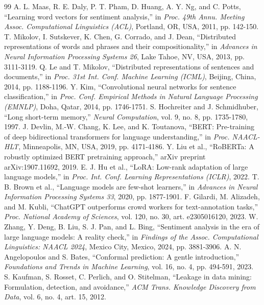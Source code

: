 \begin{thebibliography}{99}
 A. L. Maas, R. E. Daly, P. T. Pham, D. Huang, A. Y. Ng, and C. Potts, ``Learning word vectors for sentiment analysis,'' in \emph{Proc. 49th Annu. Meeting Assoc. Computational Linguistics (ACL)}, Portland, OR, USA, 2011, pp. 142-150.
 T. Mikolov, I. Sutskever, K. Chen, G. Corrado, and J. Dean, ``Distributed representations of words and phrases and their compositionality,'' in \emph{Advances in Neural Information Processing Systems 26}, Lake Tahoe, NV, USA, 2013, pp. 3111-3119.
 Q. Le and T. Mikolov, ``Distributed representations of sentences and documents,'' in \emph{Proc. 31st Int. Conf. Machine Learning (ICML)}, Beijing, China, 2014, pp. 1188-1196.
 Y. Kim, ``Convolutional neural networks for sentence classification,'' in \emph{Proc. Conf. Empirical Methods in Natural Language Processing (EMNLP)}, Doha, Qatar, 2014, pp. 1746-1751.
 S. Hochreiter and J. Schmidhuber, ``Long short-term memory,'' \emph{Neural Computation}, vol. 9, no. 8, pp. 1735-1780, 1997.
 J. Devlin, M.-W. Chang, K. Lee, and K. Toutanova, ``BERT: Pre-training of deep bidirectional transformers for language understanding,'' in \emph{Proc. NAACL-HLT}, Minneapolis, MN, USA, 2019, pp. 4171-4186.
 Y. Liu et al., ``RoBERTa: A robustly optimized BERT pretraining approach,'' arXiv preprint arXiv:1907.11692, 2019.
 E. J. Hu et al., ``LoRA: Low-rank adaptation of large language models,'' in \emph{Proc. Int. Conf. Learning Representations (ICLR)}, 2022.
 T. B. Brown et al., ``Language models are few-shot learners,'' in \emph{Advances in Neural Information Processing Systems 33}, 2020, pp. 1877-1901.
 F. Gilardi, M. Alizadeh, and M. Kubli, ``ChatGPT outperforms crowd workers for text-annotation tasks,'' \emph{Proc. National Academy of Sciences}, vol. 120, no. 30, art. e2305016120, 2023.
 W. Zhang, Y. Deng, B. Liu, S. J. Pan, and L. Bing, ``Sentiment analysis in the era of large language models: A reality check,'' in \emph{Findings of the Assoc. Computational Linguistics: NAACL 2024}, Mexico City, Mexico, 2024, pp. 3881-3906.
 A. N. Angelopoulos and S. Bates, ``Conformal prediction: A gentle introduction,'' \emph{Foundations and Trends in Machine Learning}, vol. 16, no. 4, pp. 494-591, 2023.
 S. Kaufman, S. Rosset, C. Perlich, and O. Stitelman, ``Leakage in data mining: Formulation, detection, and avoidance,'' \emph{ACM Trans. Knowledge Discovery from Data}, vol. 6, no. 4, art. 15, 2012.

\end{thebibliography}
